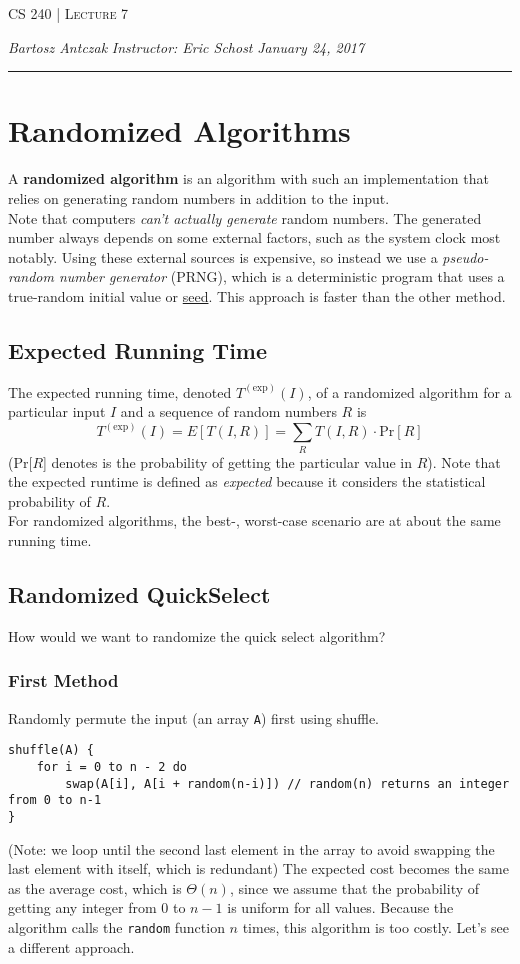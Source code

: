 \documentclass{report}
\newcommand{\lectureNum}{7}
\newcommand{\curDate}{January 24, 2017}
\newcommand{\course}{CS 240}
\begin{document}
\begin{center}
\begin{Large}
\textsc{\course{} | Lecture \lectureNum{}}
\end{Large}
\end{center} 
\noindent \textit{Bartosz Antczak} \hfill
\textit{Instructor: Eric Schost} \hfill
\textit{\curDate{}}
\rule{\textwidth}{0.4pt}

\section{Randomized Algorithms}
A \textbf{randomized algorithm} is an algorithm with such an implementation that relies on generating random numbers in addition to the input.\\
Note that computers \textit{can't actually generate} random numbers. The generated number always depends on some external factors, such as the system clock most notably. Using these external sources is expensive, so instead we use a \textit{pseudo-random number generator} (PRNG), which is a deterministic program that uses a true-random initial value or \underline{seed}. This approach is faster than the other method.
\subsection{Expected Running Time}
The expected running time, denoted $T^{(\mathrm{exp})}(I)$, of a randomized algorithm for a particular input $I$ and a sequence of random numbers $R$ is
$$T^{(\mathrm{exp})}(I) = E[T(I,R)] = \sum_{R} T(I, R) \cdot \mathrm{Pr}[R]$$
(Pr[$R$] denotes is the probability of getting the particular value in $R$). Note that the expected runtime is defined as \textit{expected} because it considers the statistical probability of $R$.\\
For randomized algorithms, the best-, worst-case scenario are at about the same running time.
\subsection{Randomized QuickSelect}
How would we want to randomize the quick select algorithm?
\subsubsection{First Method}
Randomly permute the input (an array \texttt{A}) first using shuffle.
\begin{lstlisting}
shuffle(A) {
	for i = 0 to n - 2 do
		swap(A[i], A[i + random(n-i)]) // random(n) returns an integer from 0 to n-1
}
\end{lstlisting}
(Note: we loop until the second last element in the array to avoid swapping the last element with itself, which is redundant) The expected cost becomes the same as the average cost, which is $\Theta(n)$, since we assume that the probability of getting any integer from 0 to $n-1$ is uniform for all values. Because the algorithm calls the \texttt{random} function $n$ times, this algorithm is too costly. Let's see a different approach. \newpage
\end{document}
